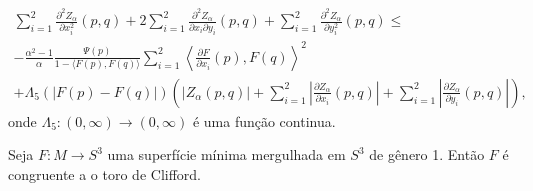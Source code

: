 \begin{proposicao}
	\begin{multline*}
		\sum_{i=1}^{2} \frac{\partial^2 Z_{\alpha}}{\partial x_i^2} (p,q) + 2 \sum_{i=1}^{2} \frac{\partial^2 Z_{\alpha}}{\partial x_i \partial y_i} (p,q) + \sum_{i=1}^{2} \frac{\partial^2 Z_{\alpha}}{\partial y_i^2} (p,q) \leq \\
		- \frac{\alpha^2 - 1}{\alpha} \frac{\Psi(p)}{1 - \langle F(p), F(q) \rangle} \sum_{i=1}^{2} \left\langle \frac{\partial F}{\partial x_i} (p), F(q) \right\rangle^2 \\
		+ \Lambda_5(|F(p) - F(q)|) \left( |Z_{\alpha}(p,q)| + \sum_{i=1}^{2} \left| \frac{\partial Z_{\alpha}}{\partial x_i} (p,q) \right| + \sum_{i=1}^{2} \left| \frac{\partial Z_{\alpha}}{\partial y_i} (p,q) \right| \right),
	\end{multline*}
	onde $\Lambda_5: (0,\infty) \rightarrow (0,\infty)$ é uma função continua.
\end{proposicao}

\begin{teorema}[Brendle]
	Seja $F: M \rightarrow S^3$ uma superfície mínima mergulhada em $S^3$ de gênero 1. Então $F$ é congruente a o toro de Clifford.
\end{teorema}